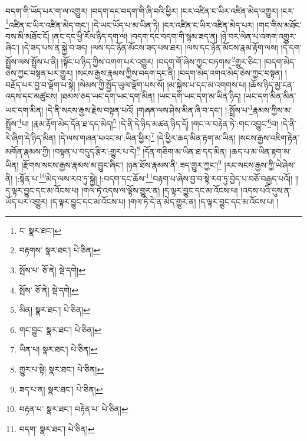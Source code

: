 བདག་གི་ཡོད་པར་ག་ལ་འགྱུར། །བདག་དང་བདག་གི་ཞི་བའི་ཕྱིར། །ངར་འཛིན་ང་ཡིར་འཛིན་མེད་འགྱུར། །ངར་\footnote{ང་  སྣར་ཐང་། }འཛིན་ང་ཡིར་འཛིན་མེད་གང་། །དེ་ཡང་ཡོད་པ་མ་ཡིན་ཏེ། །ངར་འཛིན་ང་ཡིར་འཛིན་མེད་པར། །གང་གིས་མཐོང་བས་མི་མཐོང་ངོ། །ནང་དང་ཕྱི་རོལ་ཉིད་དག་ལ། །བདག་དང་བདག་གི་སྙམ་ཟད་ན། །ཉེ་བར་ལེན་པ་འགག་འགྱུར་ཞིང་། །དེ་ཟད་པས་ན་སྐྱེ་བ་ཟད། །ལས་དང་ཉོན་མོངས་ཟད་པས་ཐར། །ལས་དང་ཉོན་མོངས་རྣམ་རྟོག་ལས། །དེ་དག་སྤྲོས་ལས་སྤྲོས་པ་ནི། །སྟོང་པ་ཉིད་ཀྱིས་འགག་པར་འགྱུར། །བདག་གོ་ཞེས་ཀྱང་བཏགས་\footnote{བརྟགས་  སྣར་ཐང་།  པེ་ཅིན། }གྱུར་ཅིང་། །བདག་མེད་ཅེས་ཀྱང་བསྟན་པར་གྱུར། །སངས་རྒྱས་རྣམས་ཀྱིས་བདག་དང་ནི། །བདག་མེད་འགའ་མེད་ཅེས་ཀྱང་བསྟན། །བརྗོད་པར་བྱ་བ་ལྡོག་པ་སྟེ། །སེམས་ཀྱི་སྤྱོད་ཡུལ་ལྡོག་པས་སོ། །མ་སྐྱེས་པ་དང་མ་འགགས་པ། །ཆོས་ཉིད་མྱ་ངན་འདས་དང་མཚུངས། །ཐམས་ཅད་ཡང་དག་ཡང་དག་མིན། །ཡང་དག་ཡང་དག་མ་ཡིན་ཉིད། །ཡང་དག་མིན་མིན་ཡང་དག་མིན། །དེ་ནི་སངས་རྒྱས་རྗེས་བསྟན་པའོ། །གཞན་ལས་ཤེས་མིན་ཞི་བ་དང་། །:སྤྲོས་པ་\footnote{སྤོས་པ་  ཅོ་ནེ།  སྡེ་དགེ། }རྣམས་ཀྱིས་མ་སྤྲོས་\footnote{སྤོས་  ཅོ་ནེ།  སྡེ་དགེ། }པ། །རྣམ་རྟོག་མེད་དོན་ཐ་དད་མེད།\footnote{མིན།  སྣར་ཐང་།  པེ་ཅིན། } །དེ་ནི་དེ་ཉིད་མཚན་ཉིད་དོ། །གང་ལ་བརྟེན་ཏེ་:གང་འབྱུང་\footnote{གང་བྱུང་  སྣར་ཐང་།  པེ་ཅིན། }བ། །དེ་ནི་རེ་ཞིག་དེ་ཉིད་མིན། །དེ་ལས་གཞན་པའང་མ་:ཡིན་ཕྱིར།\footnote{ཡིན་པ།  སྣར་ཐང་།  པེ་ཅིན། } །དེ་ཕྱིར་ཆད་མིན་རྟག་མ་ཡིན། །སངས་རྒྱས་འཇིག་རྟེན་མགོན་རྣམས་ཀྱི། །བསྟན་པ་བདུད་རྩིར་:གྱུར་པ་དེ།\footnote{གྱུར་པ་སྟེ།  སྣར་ཐང་།  པེ་ཅིན། } །དོན་གཅིག་མ་ཡིན་ཐ་དད་མིན། །ཆད་པ་མ་ཡིན་རྟག་མ་ཡིན། །རྫོགས་སངས་རྒྱས་རྣམས་མ་བྱུང་ཞིང་། །ཉན་ཐོས་རྣམས་ནི་:ཟད་གྱུར་ཀྱང་།\footnote{ཟད་པ་ན།  སྣར་ཐང་།  པེ་ཅིན། } །རང་སངས་རྒྱས་ཀྱི་ཡེ་ཤེས་ནི། །:སྟོན་པ་\footnote{བརྟན་པ་  སྣར་ཐང་། བརྟེན་པ་  པེ་ཅིན། }མེད་ལས་རབ་ཏུ་སྐྱེ། །:བདག་དང་ཆོས་\footnote{བདག་  སྣར་ཐང་།  པེ་ཅིན། }བརྟག་པ་ཞེས་བྱ་བ་སྟེ་རབ་ཏུ་བྱེད་པ་བཅོ་བརྒྱད་པའོ།། །།ད་ལྟར་བྱུང་དང་མ་འོངས་པ། །གལ་ཏེ་འདས་ལ་ལྟོས་གྱུར་ན། །ད་ལྟར་བྱུང་དང་མ་འོངས་པ། །འདས་པའི་དུས་ན་ཡོད་པར་འགྱུར། །ད་ལྟར་བྱུང་དང་མ་འོངས་པ། །གལ་ཏེ་དེ་ན་མེད་གྱུར་ན། །ད་ལྟར་བྱུང་དང་མ་འོངས་པ། །
